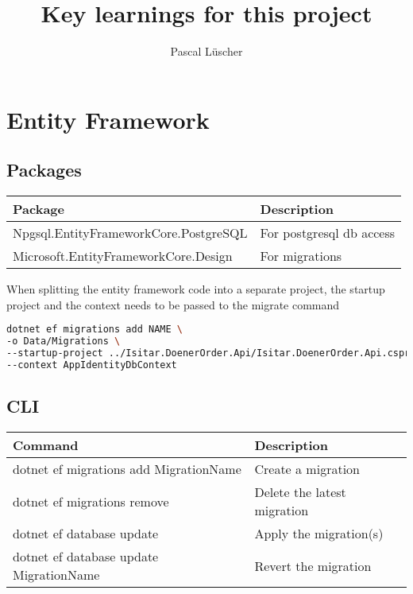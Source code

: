 \documentclass[12pt, a4paper, parskip=half]{scrreprt}
\begin{document}
\title{Key learnings for this project}
\author{Pascal Lüscher}

\maketitle
\thispagestyle{empty}
\tableofcontents

\chapter{Entity Framework}

\section{Packages}
\begin{table}[h!]
\centering
	\begin{tabular}{|l l|}
		\hline
		Package & Description \\
		\hline \hline
		Npgsql.EntityFrameworkCore.PostgreSQL & For postgresql db access \\
		
		Microsoft.EntityFrameworkCore.Design & For migrations \\
		\hline
	\end{tabular}
\end{table}

When splitting the entity framework code into a separate project, the startup project and the context needs to be passed to the migrate command

\begin{lstlisting}[language=bash]
dotnet ef migrations add NAME \
-o Data/Migrations \
--startup-project ../Isitar.DoenerOrder.Api/Isitar.DoenerOrder.Api.csproj \
--context AppIdentityDbContext
\end{lstlisting}

\section{CLI}

\begin{table}[h!]
\centering
	\begin{tabular}{|l l|}
		\hline
		Command & Description \\
		\hline \hline
		dotnet ef migrations add MigrationName & Create a migration \\
		dotnet ef migrations remove & Delete the latest migration \\
		\hline
		dotnet ef database update & Apply the migration(s) \\
		dotnet ef database update MigrationName & Revert the migration \\
		\hline
	\end{tabular}
\end{table}
\end{document}
